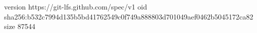 version https://git-lfs.github.com/spec/v1
oid sha256:b532c7994d135b5bd41762549c0f749a888803d701049aef0462b5045172ca82
size 87544
